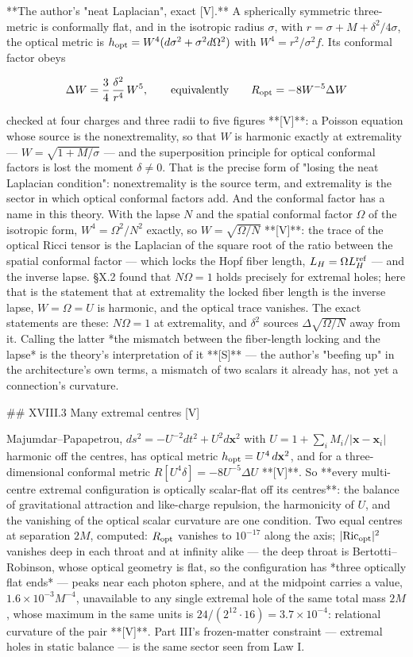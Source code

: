 **The author's "neat Laplacian", exact [V].** A spherically symmetric three-metric is conformally flat, and in the isotropic radius $\sigma$, with $r = \sigma+M+\delta^2/4\sigma$, the optical metric is $h_{\rm opt} = W^4(d\sigma^2+\sigma^2d\Omega^2)$ with $W^4 = r^2/\sigma^2f$. Its conformal factor obeys

$$\Delta W = \frac34\,\frac{\delta^2}{r^4}\,W^5,\qquad\text{equivalently}\qquad R_{\rm opt} = -8W^{-5}\Delta W$$

checked at four charges and three radii to five figures **[V]**: a Poisson equation whose source is the nonextremality, so that $W$ is harmonic exactly at extremality — $W = \sqrt{1+M/\sigma}$ — and the superposition principle for optical conformal factors is lost the moment $\delta\neq0$. That is the precise form of "losing the neat Laplacian condition": nonextremality is the source term, and extremality is the sector in which optical conformal factors add. And the conformal factor has a name in this theory. With the lapse $N$ and the spatial conformal factor $\Omega$ of the isotropic form, $W^4 = \Omega^2/N^2$ exactly, so $W = \sqrt{\Omega/N}$ **[V]**: the trace of the optical Ricci tensor is the Laplacian of the square root of the ratio between the spatial conformal factor — which locks the Hopf fiber length, $L_H = \Omega L_H^{\rm ref}$ — and the inverse lapse. §X.2 found that $N\Omega = 1$ holds precisely for extremal holes; here that is the statement that at extremality the locked fiber length is the inverse lapse, $W = \Omega = U$ is harmonic, and the optical trace vanishes. The exact statements are these: $N\Omega = 1$ at extremality, and $\delta^2$ sources $\Delta\sqrt{\Omega/N}$ away from it. Calling the latter *the mismatch between the fiber-length locking and the lapse* is the theory's interpretation of it **[S]** — the author's "beefing up" in the architecture's own terms, a mismatch of two scalars it already has, not yet a connection's curvature.

## XVIII.3 Many extremal centres [V]

Majumdar–Papapetrou, $ds^2 = -U^{-2}dt^2+U^2d\mathbf x^2$ with $U = 1+\sum_iM_i/|\mathbf x-\mathbf x_i|$ harmonic off the centres, has optical metric $h_{\rm opt} = U^4\,d\mathbf x^2$, and for a three-dimensional conformal metric $R[U^4\delta] = -8U^{-5}\Delta U$ **[V]**. So **every multi-centre extremal configuration is optically scalar-flat off its centres**: the balance of gravitational attraction and like-charge repulsion, the harmonicity of $U$, and the vanishing of the optical scalar curvature are one condition. Two equal centres at separation $2M$, computed: $R_{\rm opt}$ vanishes to $10^{-17}$ along the axis; $|{\rm Ric}_{\rm opt}|^2$ vanishes deep in each throat and at infinity alike — the deep throat is Bertotti–Robinson, whose optical geometry is flat, so the configuration has *three optically flat ends* — peaks near each photon sphere, and at the midpoint carries a value, $1.6\times10^{-3}M^{-4}$, unavailable to any single extremal hole of the same total mass $2M$, whose maximum in the same units is $24/(2^{12}\cdot16) = 3.7\times10^{-4}$: relational curvature of the pair **[V]**. Part III's frozen-matter constraint — extremal holes in static balance — is the same sector seen from Law I.

